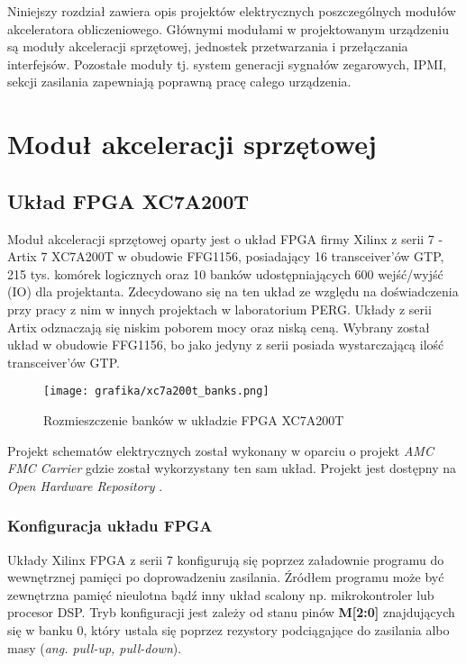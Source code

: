 
Niniejszy rozdział zawiera opis projektów elektrycznych poszczególnych modułów akceleratora obliczeniowego. Głównymi modułami w projektowanym urządzeniu są moduły akceleracji sprzętowej, jednostek przetwarzania i przełączania interfejsów. Pozostałe moduły tj. system generacji sygnałów zegarowych, IPMI, sekcji zasilania zapewniają poprawną pracę całego urządzenia. 


\section{Moduł akceleracji sprzętowej}
\subsection{Układ FPGA XC7A200T}
Moduł akceleracji sprzętowej oparty jest o układ FPGA firmy Xilinx \cite{COMPANY:Xilinx} z serii 7 - Artix 7 XC7A200T w obudowie FFG1156, posiadający 16 transceiver'ów GTP, 215 tys. komórek logicznych oraz 10 banków udostępniających 600 wejść/wyjść (IO) dla projektanta. Zdecydowano się na ten układ ze względu na doświadczenia przy pracy z nim w innych projektach w laboratorium PERG. Układy z serii Artix odznaczają się niskim poborem mocy oraz niską ceną. Wybrany został układ w obudowie FFG1156, bo jako jedyny z serii posiada wystarczającą ilość transceiver'ów GTP.

\begin{figure}[!ht]
\centering
\texttt{[image: grafika/xc7a200t\_banks.png]}
\caption{Rozmieszczenie banków w układzie FPGA XC7A200T}
\label{ARTIX_BANKS}
\end{figure}

Projekt schematów elektrycznych został wykonany w oparciu o projekt \textit{AMC FMC Carrier} gdzie został wykorzystany ten sam układ. Projekt jest dostępny na \textit{Open Hardware Repository} \cite{OHWR}.


\subsubsection{Konfiguracja układu FPGA}
Układy Xilinx FPGA z serii 7 konfigurują się poprzez załadownie programu do wewnętrznej pamięci po doprowadzeniu zasilania. Źródłem programu może być zewnętrzna pamięć nieulotna bądź inny układ scalony np. mikrokontroler lub procesor DSP. Tryb konfiguracji jest zależy od stanu pinów \textbf{M[2:0]} znajdujących się w banku 0, który ustala się poprzez rezystory podciągające do zasilania albo masy (\textit{ang. pull-up, pull-down}).

